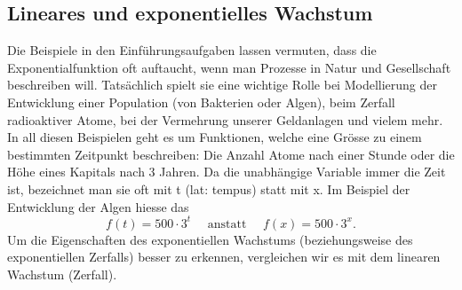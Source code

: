 \documentclass[11pt,oneside]{article}
\begin{document}
\subsection{Lineares und exponentielles Wachstum}
	Die Beispiele in den Einführungsaufgaben lassen vermuten, dass die Exponentialfunktion oft auftaucht, wenn man Prozesse in Natur und Gesellschaft beschreiben will. Tatsächlich spielt sie eine wichtige Rolle bei Modellierung der Entwicklung einer Population (von Bakterien oder Algen), beim Zerfall radioaktiver Atome, bei der Vermehrung unserer Geldanlagen und vielem mehr.
	In all diesen Beispielen geht es um Funktionen, welche eine Grösse zu einem bestimmten Zeitpunkt beschreiben: Die Anzahl Atome nach einer Stunde oder die Höhe eines Kapitals nach 3 Jahren. Da die unabhängige Variable immer die Zeit ist, bezeichnet man sie oft mit t (lat: tempus) statt mit x. Im Beispiel der Entwicklung der Algen hiesse das
	\[f(t)=500\cdot 3^t\quad\text{ anstatt }\quad f(x)=500\cdot 3^x.\]
	Um die Eigenschaften des exponentiellen Wachstums (beziehungsweise des exponentiellen Zerfalls) besser zu erkennen, vergleichen wir es mit dem linearen Wachstum (Zerfall).
\end{document}
